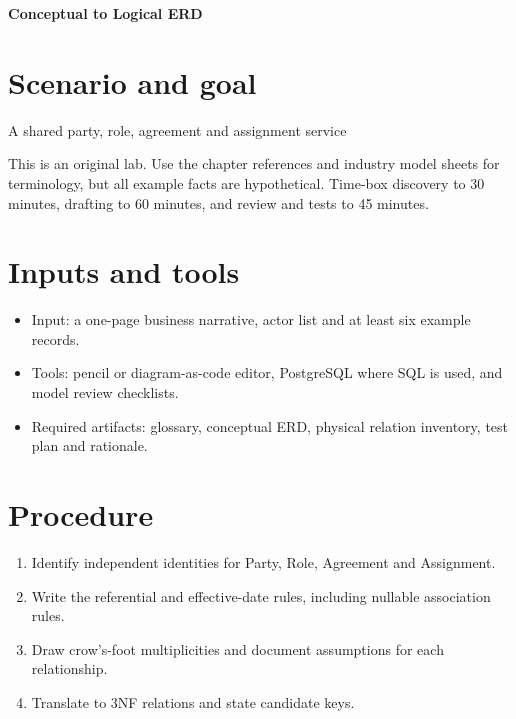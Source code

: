 \documentclass[11pt,letterpaper]{article}
\begin{document}
\begin{center}
{\LARGE\bfseries\color{navy} Conceptual to Logical ERD}\par
\vspace{0.25em}{\large Practical modeling laboratory}\par
{}
\end{center}
\vspace{0.8em}
\section{Scenario and goal}
A shared party, role, agreement and assignment service

This is an original lab. Use the chapter references and industry model sheets for terminology, but all example facts are hypothetical. Time-box discovery to 30 minutes, drafting to 60 minutes, and review and tests to 45 minutes.


\section{Inputs and tools}
\begin{itemize}
\item Input: a one-page business narrative, actor list and at least six example records.
\item Tools: pencil or diagram-as-code editor, PostgreSQL where SQL is used, and model review checklists.
\item Required artifacts: glossary, conceptual ERD, physical relation inventory, test plan and rationale.
\end{itemize}

\section{Procedure}
\begin{enumerate}
\item Identify independent identities for Party, Role, Agreement and Assignment.
\item Write the referential and effective-date rules, including nullable association rules.
\item Draw crow's-foot multiplicities and document assumptions for each relationship.
\item Translate to 3NF relations and state candidate keys.
\end{enumerate}
\end{document}
